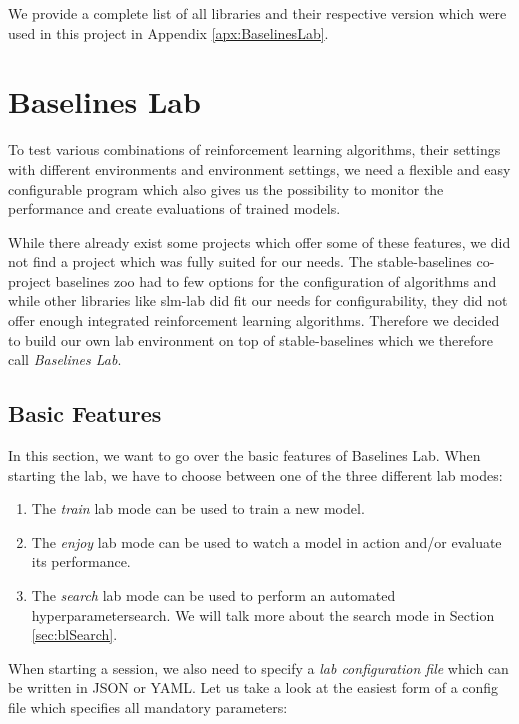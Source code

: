 We provide a complete list of all libraries and their respective version which were used in this project in Appendix \ref{apx:BaselinesLab}.  

\section{Baselines Lab} \label{sec:BaselinesLab}
To test various combinations of reinforcement learning algorithms, their settings with different environments and environment settings, we need a flexible and easy configurable program which also gives us the possibility to monitor the performance and create evaluations of trained models. 

While there already exist some projects which offer some of these features, we did not find a project which was fully suited for our needs. The stable-baselines co-project baselines zoo \cite{rl-zoo} had to few options for the configuration of algorithms and while other libraries like slm-lab \cite{kenggraesser2017slmlab} did fit our needs for configurability, they did not offer enough integrated reinforcement learning algorithms. Therefore we decided to build our own lab environment on top of stable-baselines which we therefore call \textit{Baselines Lab}.

\subsection{Basic Features} \label{sec:blFunctions}
In this section, we want to go over the basic features of Baselines Lab. When starting the lab, we have to choose between one of the three different lab modes:

\begin{enumerate}
    \item The \textit{train} lab mode can be used to train a new model.
    \item The \textit{enjoy} lab mode can be used to watch a model in action and/or evaluate its performance.
    \item The \textit{search} lab mode can be used to perform an automated hyperparametersearch. We will talk more about the search mode in Section \ref{sec:blSearch}.
\end{enumerate}

When starting a session, we also need to specify a \textit{lab configuration file} which can be written in JSON or YAML. Let us take a look at the easiest form of a config file which specifies all mandatory parameters:

